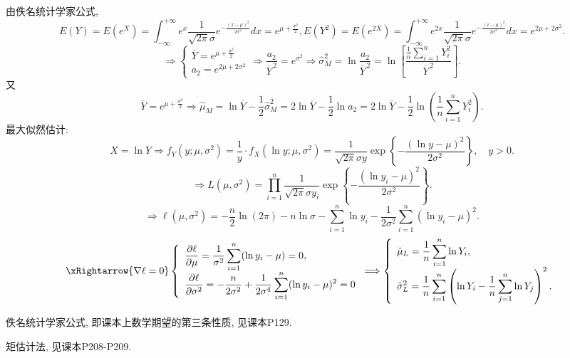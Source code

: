 \documentclass[standard]{ExBook}
\begin{document}
\begin{qitems}
由佚名统计学家公式,
$$
E(Y)
=E(e^X)
=\int_{-\infty}^{+\infty}e^x\frac{1}{\sqrt{2\pi}\sigma}e^{-\frac{(x-\mu)^2}{2\sigma^2}}dx
=e^{\mu+\frac{\sigma^2}{2}}
,
E(Y^2)
=E(e^{2X})
=\int_{-\infty}^{+\infty}e^{2x}\frac{1}{\sqrt{2\pi}\sigma}e^{-\frac{(x-\mu)^2}{2\sigma^2}}dx
=e^{2\mu+2\sigma^2}.
$$
$$
\Longrightarrow
\left\{
\begin{array}{l}
\displaystyle
\overline{Y}=e^{\mu+\frac{\sigma^2}{2}}\\
\displaystyle
a_2=e^{2\mu+2\sigma^2}
\end{array}
\right.
\Longrightarrow
\frac{a_2}{\overline{Y}^{\,2}}
=e^{\sigma^2}
\Longrightarrow
\hat{\sigma}_{M}^{2}
=\ln\frac{a_2}{\overline{Y}^{\,2}}
=\ln\left[
\frac{\frac{1}{n}\sum\limits_{i=1}^{n}Y_i^2}{\overline{Y}^{\,2}}
\right].
$$
又
$$
\overline{Y}=e^{\mu+\frac{\sigma^2}{2}}
\Longrightarrow
\hat{\mu}_{M}
=\ln\overline{Y}-\frac{1}{2}\hat{\sigma}_{M}^{2}
=2\ln\overline{Y}-\frac{1}{2}\ln a_2
=2\ln\overline{Y}
-\frac{1}{2}\ln\left(\frac{1}{n}\sum_{i=1}^{n}Y_i^2\right).
$$
 最大似然估计:
$$
X=\ln Y
\Longrightarrow
f_Y(y;\mu,\sigma^2)
=\frac{1}{y}\cdot f_X(\ln y;\mu,\sigma^2)
=\frac{1}{\sqrt{2\pi}\sigma y}
\exp\left\{-\frac{(\ln y-\mu)^2}{2\sigma^2}\right\},
\quad y>0.
$$
$$
\Longrightarrow
L(\mu,\sigma^2)
=\prod_{i=1}^{n}
\frac{1}{\sqrt{2\pi}\sigma y_i}
\exp\left\{-\frac{(\ln y_i-\mu)^2}{2\sigma^2}\right\}.
$$
$$
\Longrightarrow
\ell(\mu,\sigma^2)
=-\frac{n}{2}\ln(2\pi)-n\ln\sigma-\sum_{i=1}^{n}\ln y_i
-\frac{1}{2\sigma^2}\sum_{i=1}^{n}(\ln y_i-\mu)^2.
$$
$$
\xRightarrow{\nabla\ell=0}
\left\{
\begin{array}{l}
\displaystyle
\frac{\partial\ell}{\partial\mu}
=\frac{1}{\sigma^2}\sum\limits_{i=1}^{n}(\ln y_i-\mu)=0,\\[0.8em]
\displaystyle
\frac{\partial\ell}{\partial\sigma^2}
=-\frac{n}{2\sigma^2}
+\frac{1}{2\sigma^4}\sum\limits_{i=1}^{n}(\ln y_i-\mu)^2=0
\end{array}
\right.
\Longrightarrow
\left\{
\begin{array}{l}
\displaystyle
\hat{\mu}_{L}
=\frac{1}{n}\sum\limits_{i=1}^{n}\ln Y_i,\\[0.9em]
\displaystyle
\hat{\sigma}_{L}^{2}
=\frac{1}{n}\sum\limits_{i=1}^{n}
\left(\ln Y_i-\frac{1}{n}\sum\limits_{j=1}^{n}\ln Y_j\right)^2.
\end{array}
\right.
$$

\textcolor{themeColor}{\selectfont {} 佚名统计学家公式, 即课本上数学期望的第三条性质, 见课本P129.}

\textcolor{themeColor}{\selectfont {} 矩估计法, 见课本P208-P209.}


\end{qitems}
\end{document}
